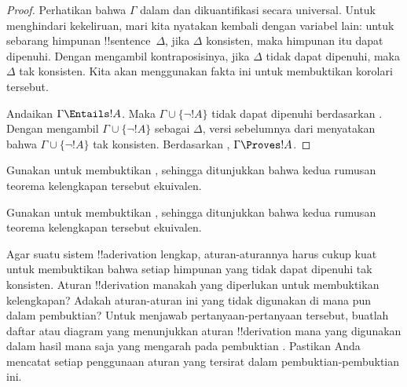 \documentclass[../../../include/open-logic-section]{subfiles}
\begin{document}
\begin{proof}
Perhatikan bahwa $\Gamma$ dalam  dan
 dikuantifikasi secara universal. Untuk
menghindari kekeliruan, mari kita nyatakan kembali
 dengan variabel lain: untuk sebarang himpunan
!!{sentence}~$\Delta$, jika $\Delta$ konsisten, maka himpunan itu dapat
dipenuhi. Dengan mengambil kontraposisinya, jika $\Delta$ tidak dapat
dipenuhi, maka $\Delta$ tak konsisten. Kita akan menggunakan fakta ini
untuk membuktikan korolari tersebut.

Andaikan $\Gamma \Entails !A$. Maka $\Gamma \cup \{\lnot !A\}$ tidak
dapat dipenuhi berdasarkan . Dengan
mengambil $\Gamma \cup \{\lnot !A\}$ sebagai $\Delta$, versi sebelumnya
dari  menyatakan bahwa $\Gamma \cup \{\lnot
!A\}$ tak konsisten. Berdasarkan
,
$\Gamma \Proves !A$.
\end{proof}

\begin{prob}
Gunakan  untuk membuktikan
, sehingga ditunjukkan bahwa kedua
rumusan teorema kelengkapan tersebut ekuivalen.
\end{prob}
\tagendprob

\begin{prob}
Gunakan  untuk membuktikan
, sehingga ditunjukkan bahwa kedua
rumusan teorema kelengkapan tersebut ekuivalen.
\end{prob}
\tagendprob

\begin{prob}
Agar suatu sistem !!a{derivation} lengkap, aturan-aturannya harus cukup
kuat untuk membuktikan bahwa setiap himpunan yang tidak dapat dipenuhi
tak konsisten. Aturan !!{derivation} manakah yang diperlukan untuk
membuktikan kelengkapan? Adakah aturan-aturan ini yang tidak digunakan
di mana pun dalam pembuktian? Untuk menjawab pertanyaan-pertanyaan
tersebut, buatlah daftar atau diagram yang menunjukkan aturan
!!{derivation} mana yang digunakan dalam hasil mana saja yang mengarah pada
pembuktian . Pastikan Anda mencatat
setiap penggunaan aturan yang tersirat dalam pembuktian-pembuktian ini.
\end{prob}
\tagendprob
\end{document}
